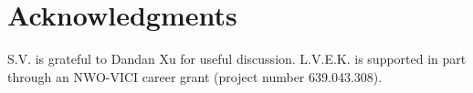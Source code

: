 \documentclass[useAMS,usenatbib]{mn2e}
\begin{document}

\section*{Acknowledgments}
S.V. is grateful to Dandan Xu for useful discussion.
L.V.E.K. is supported in part through an NWO-VICI career grant (project number 639.043.308).






\label{lastpage}
\end{document}
